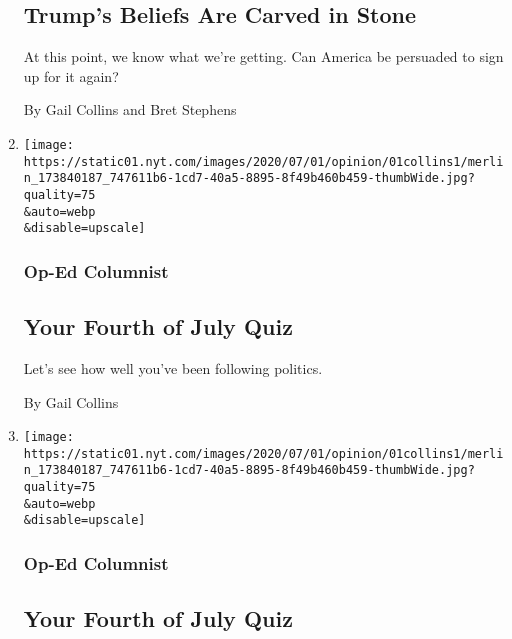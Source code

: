 \begin{enumerate}
  \hypertarget{trumps-beliefs-are-carved-in-stone}{%
  \subsection{Trump's Beliefs Are Carved in
  Stone}\label{trumps-beliefs-are-carved-in-stone}}

  At this point, we know what we're getting. Can America be persuaded to
  sign up for it again?

  By Gail Collins and Bret Stephens
\item
  \href{/interactive/2020/07/01/opinion/4th-of-july-quiz.html}{}

  \texttt{[image: https://static01.nyt.com/images/2020/07/01/opinion/01collins1/merlin\_173840187\_747611b6-1cd7-40a5-8895-8f49b460b459-thumbWide.jpg?quality=75\\\&auto=webp\\\&disable=upscale]}

  \hypertarget{op-ed-columnist}{%
  \subsubsection{Op-Ed Columnist}\label{op-ed-columnist}}

  \hypertarget{your-fourth-of-july-quiz}{%
  \subsection{Your Fourth of July Quiz}\label{your-fourth-of-july-quiz}}

  Let's see how well you've been following politics.

  By Gail Collins
\item
  \href{/interactive/2020/07/01/opinion/4th-of-july-quiz.html}{}

  \texttt{[image: https://static01.nyt.com/images/2020/07/01/opinion/01collins1/merlin\_173840187\_747611b6-1cd7-40a5-8895-8f49b460b459-thumbWide.jpg?quality=75\\\&auto=webp\\\&disable=upscale]}

  \hypertarget{op-ed-columnist-1}{%
  \subsubsection{Op-Ed Columnist}\label{op-ed-columnist-1}}

  \hypertarget{your-fourth-of-july-quiz-1}{%
  \subsection{Your Fourth of July
  Quiz}\label{your-fourth-of-july-quiz-1}}


\end{enumerate}
